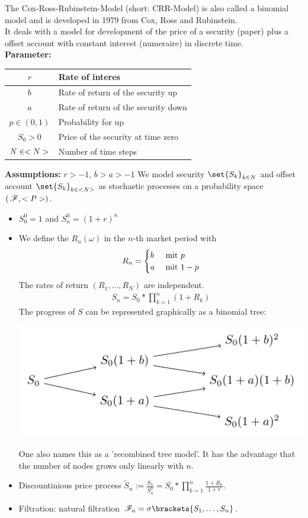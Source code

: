 The Cox-Ross-Rubinstein-Model (short: CRR-Model) is also called a binomial model and is developed in 1979 from Cox, Ross and Rubinstein.\\
It deals with a model for development of the price of a security (paper) plus a offset account with constant interest (numeraire) in discrete time.\\
\textbf{Parameter:}

\begin{center}
	\begin{tabular}{|c|l|}
		\hline
		$r$ & Rate of interes \\ \hline
		$b$ & Rate of return of the security up \\ \hline
		$a$ & Rate of return of the security down \\ \hline
		$p \in (0,1)$ &Probability for up \\ \hline
		$S_0 > 0$ & Price of the security at time zero \\ \hline
		$N \in \N$ & Number of time steps \\ \hline
	\end{tabular}
\end{center}
\textbf{Assumptions:} $r > -1$, $b > a > -1$
We model security $\set{S_k}_{k \in N}$ and offset account $\set{S_k}_{k \in \N}$ as stochastic processes on a probability space $(\, \F, \P)$.
\begin{itemize}
	\item $S_0^0 = 1$ and $S_n^0 = (1+r)^n$
	\item We define the  $R_n(\omega)$ in the $n$-th market period with
	\begin{align*}
	R_n = \begin{cases} b & \mit p \\ a & \mit 1-p \end{cases}
	\end{align*}
	The rates of return $(R_1, \dots, R_N)$ are independent.
	\begin{align*}
	S_n = S_0 * \prod_{k=1}^n (1+R_k)
	\end{align*}
	The progress of $S$ can be represented graphically as a binomial tree: 
	\begin{center}
		\includegraphics[width=.5\textwidth]{tikz/stochv_1_2_crr.pdf}
	\end{center}
	One also names this as a 'recombined tree model'. It has the advantage that the number of nodes grows only linearly with $n$. 
	\item Discountinious price process $\tilde{S}_n := \frac{S_n}{S_n^0} = S_0 * \prod_{k=1}^n \frac{1+R_k}{1+r}$.
	\item Filtration: natural filtration $\F_n = \sigma \brackets{S_1, \dots, S_n}$.
\end{itemize}
